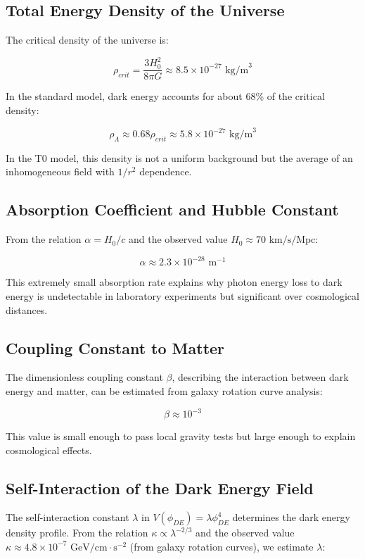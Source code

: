 \documentclass[a4paper,12pt]{article}
\theoremstyle{definition}
\theoremstyle{remark}
\begin{document}
	\subsection{Total Energy Density of the Universe}
	The critical density of the universe is:
	
	\begin{equation}
		\rho_{crit} = \frac{3H_0^2}{8\pi G} \approx 8.5 \times 10^{-27} \text{ kg/m}^3
	\end{equation}
	
	In the standard model, dark energy accounts for about 68\% of the critical density:
	
	\begin{equation}
		\rho_{\Lambda} \approx 0.68 \rho_{crit} \approx 5.8 \times 10^{-27} \text{ kg/m}^3
	\end{equation}
	
	In the T0 model, this density is not a uniform background but the average of an inhomogeneous field with $1/r^2$ dependence.
	
	\subsection{Absorption Coefficient and Hubble Constant}
	From the relation $\alpha = H_0/c$ and the observed value $H_0 \approx 70 \text{ km/s/Mpc}$:
	
	\begin{equation}
		\alpha \approx 2.3 \times 10^{-28} \text{ m}^{-1}
	\end{equation}
	
	This extremely small absorption rate explains why photon energy loss to dark energy is undetectable in laboratory experiments but significant over cosmological distances.
	
	\subsection{Coupling Constant to Matter}
	The dimensionless coupling constant $\beta$, describing the interaction between dark energy and matter, can be estimated from galaxy rotation curve analysis:
	
	\begin{equation}
		\beta \approx 10^{-3}
	\end{equation}
	
	This value is small enough to pass local gravity tests but large enough to explain cosmological effects.
	
	\subsection{Self-Interaction of the Dark Energy Field}
	The self-interaction constant $\lambda$ in $V(\phi_{DE}) = \lambda \phi_{DE}^4$ determines the dark energy density profile. From the relation $\kappa \propto \lambda^{-2/3}$ and the observed value $\kappa \approx 4.8 \times 10^{-7} \text{ GeV/cm} \cdot \text{s}^{-2}$ (from galaxy rotation curves), we estimate $\lambda$:
	
\end{document}
